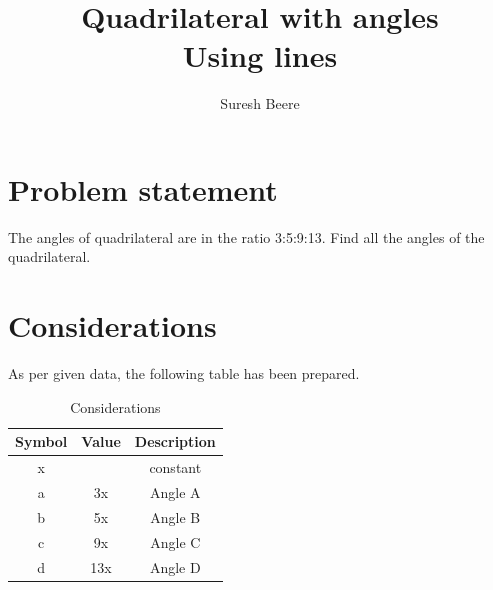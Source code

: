 \documentclass[journal,10pt,twocolumn]{article}
\begin{document}

\let\vec\mathbf


\title{
{Quadrilateral with angles \\
Using lines}\\
}
\author{Suresh Beere}
\maketitle
\tableofcontents
\section{Problem statement}
\begin{flushleft}
The angles of quadrilateral are in the ratio 3:5:9:13. Find all the angles of the quadrilateral.\\
\end{flushleft}

\section{Considerations}
\vspace{0.2cm}
\begin{flushleft}
As per given data, the following table has been prepared.\\
\end{flushleft}
\vspace{0.3cm}
\begin{table}[htbp]
    \centering
\setlength\extrarowheight{2pt}
\begin{tabular}{|c|c|c|} \hline
      \textbf{Symbol}           &   \textbf{Value}   & \textbf{Description}\\ \hline
	x &  & constant\\  \hline
	a & 3x & Angle A\\ \hline
	b & 5x & Angle B\\ \hline
    c & 9x & Angle C \\ \hline
    d & 13x & Angle D \\ \hline
\end{tabular}
\caption{\label{tab:widgets}Considerations}
\end{table}
\end{document}
